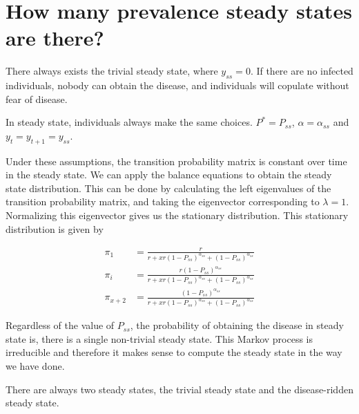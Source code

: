 \documentclass[12pt]{paper}
\begin{document}

\section*{How many prevalence steady states are there?}

There always exists the trivial steady state, where $y_{ss} = 0$. If
there are no infected individuals, nobody can obtain the disease, and
individuals will copulate without fear of disease.

In steady state, individuals always make the same choices. $P^{*} =
P_{ss}$, $\alpha = \alpha_{ss}$ and $y_t = y_{t+1} = y_{ss}$.

Under these assumptions, the transition probability matrix is constant
over time in the steady state. We can apply the balance equations to
obtain the steady state distribution. This can be done by calculating
the left eigenvalues of the transition probability matrix, and taking
the eigenvector corresponding to $\lambda = 1$. Normalizing this eigenvector
gives us the stationary distribution. This stationary distribution is
given by

\begin{align*}
  \pi_1 &= \frac{r}{r+xr (1-P_{ss})^{\alpha_{ss}} + (1-P_{ss})^{\alpha_{ss}}}\\
  \pi_i &= \frac{r (1-P_{ss})^{\alpha_{ss}} }{r+xr (1-P_{ss})^{\alpha_{ss}}
            +(1-P_{ss})^{\alpha_{ss}} }\\
  \pi_{x+2} &= \frac{(1-P_{ss})^{\alpha_{ss}}}{r+xr (1-P_{ss})^{\alpha_{ss}}
            +(1-P_{ss})^{\alpha_{ss}} }
\end{align*}

Regardless of the value of $P_{ss}$, the probability of obtaining the
disease in steady state is, there is a single non-trivial steady
state. This Markov process is irreducible and therefore it makes sense
to compute the steady state in the way we have done.

There are always two steady states, the trivial steady state and the
disease-ridden steady state.

\end{document}
